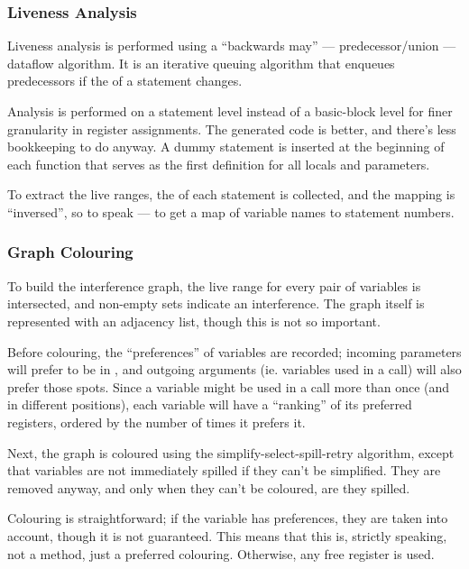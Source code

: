 \documentclass[12pt]{article}
\begin{document}
\subsubsection{Liveness Analysis}

Liveness analysis is performed using a \enquote{backwards may} --- predecessor/union --- dataflow algorithm. It is an
iterative queuing algorithm that enqueues predecessors if the  of a statement changes.

Analysis is performed on a statement level instead of a basic-block level for finer granularity in register assignments.
The generated code is better, and there's less bookkeeping to do anyway. A dummy statement is inserted at the beginning
of each function that serves as the first definition for all locals and parameters.

To extract the live ranges, the  of each statement is collected, and the mapping is \enquote{inversed}, so to
speak --- to get a map of variable names to statement numbers.



\subsubsection{Graph Colouring}

To build the interference graph, the live range for every pair of variables is intersected, and non-empty sets indicate
an interference. The graph itself is represented with an adjacency list, though this is not so important.

Before colouring, the \enquote{preferences} of variables are recorded; incoming parameters will prefer to be in , and
outgoing arguments (ie. variables used in a call) will also prefer those spots. Since a variable might be used in a call
more than once (and in different positions), each variable will have a \enquote{ranking} of its preferred registers, ordered
by the number of times it prefers it.

Next, the graph is coloured using the simplify-select-spill-retry algorithm, except that variables are not immediately spilled
if they can't be simplified. They are removed anyway, and only when they  can't be coloured, are they spilled.

Colouring is straightforward; if the variable has preferences, they are taken into account, though it is not guaranteed. This
means that this is, strictly speaking, not a  method, just a preferred colouring. Otherwise, any free
register is used.
\end{document}
